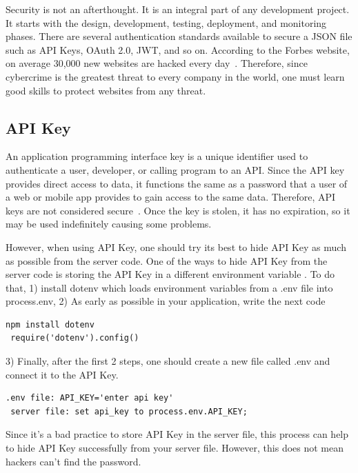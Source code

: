 \documentclass[11pt]{article}
\begin{document}
Security is not an afterthought. It is an integral part of any development project. It starts with the design, development, testing, deployment, and monitoring phases. 
There are several authentication standards available to secure a JSON file such as API Keys, OAuth 2.0, JWT, and so on. According to the Forbes website, on average 30,000 new websites are hacked every day~\cite{30000Web65:online}. Therefore, since cybercrime is the greatest threat to every company in the world, one must learn good skills to protect websites from any threat.

\subsection{API Key}

An application programming interface key is a unique identifier used to authenticate a user, developer, or calling program to an API. Since the API key provides direct access to data, it functions the same as a password that a user of a web or mobile app provides to gain access to the same data. Therefore, API keys are not considered secure~\cite{Whyandwh4:online}. Once the key is stolen, it has no expiration, so it may be used indefinitely causing some problems.

However, when using API Key, one should try its best to hide API Key as much as possible from the server code. One of the ways to hide API Key from the server code is storing the API Key in a different environment variable \cite{dotenvnp6:online}. To do that, 1) install dotenv which loads environment variables from a .env file into process.env, 2) As early as possible in your application, write the next code

\begin{lstlisting}[caption=\texttt{Hiding API Key}, captionpos=b, frame=trbl, showstringspaces=false]
 npm install dotenv
 require('dotenv').config()
\end{lstlisting}

3) Finally, after the first 2 steps, one should create a new file called .env and connect it to the API Key. 
\begin{lstlisting}[caption=\texttt{Hiding API Key, Part 2}, captionpos=b,
frame=trbl, showstringspaces=false]
 .env file: API_KEY='enter api key'
 server file: set api_key to process.env.API_KEY;
\end{lstlisting}

Since it's a bad practice to store API Key in the server file, this process can help to hide API Key successfully from your server file. However, this does not mean hackers can't find the password.
\end{document}

